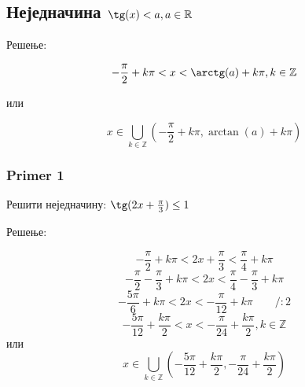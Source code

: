 \documentclass[../diplomski.tex]{subfiles}
\begin{document}
\subsection{Неједначина $\tg(x)<a,a\in\mathbb{R}$}

Решење:

\[-\frac{\pi}{2}+k\pi<x<\arctg(a)+k\pi,k\in\mathbb{Z}\]
\centerline{или}
\[x\in\bigcup_{k\in\mathbb{Z}}\left(-\frac{\pi}{2}+k\pi,\arctan(a)+k\pi\right)\]

\subsubsection{Primer 1}

Решити неједначину: $\tg(2x+\frac{\pi}{3})\le1$

Решење:

\[-\frac{\pi}{2}+k\pi<2x+\frac{\pi}{3}<\frac{\pi}{4}+k\pi\]
\[-\frac{\pi}{2}-\frac{\pi}{3}+k\pi<2x<\frac{\pi}{4}-\frac{\pi}{3}+k\pi\]
\[-\frac{5\pi}{6}+k\pi<2x<-\frac{\pi}{12}+k\pi\qquad/:2\]
\[-\frac{5\pi}{12}+\frac{k\pi}{2}<x<-\frac{\pi}{24}+\frac{k\pi}{2},k\in\mathbb{Z}\]
или
\[x\in\bigcup_{k\in\mathbb{Z}}\left(-\frac{5\pi}{12}+\frac{k\pi}{2},-\frac{\pi}{24}+\frac{k\pi}{2}\right)\]
\end{document}
